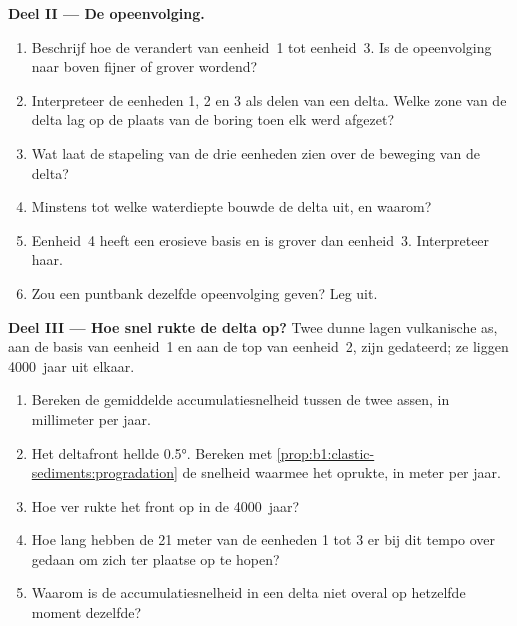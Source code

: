 \begin{problem}
\medskip
\noindent\textbf{Deel II --- De opeenvolging.}
\begin{enumerate}[resume]
  \item Beschrijf hoe de  verandert van eenheid~1 tot
        eenheid~3. Is de opeenvolging naar boven fijner of grover wordend?
  \item Interpreteer de eenheden 1, 2 en 3 als delen van een delta. Welke zone
        van de delta lag op de plaats van de boring toen elk werd afgezet?
  \item Wat laat de stapeling van de drie eenheden zien over de beweging van de
        delta?
  \item Minstens tot welke waterdiepte bouwde de delta uit, en waarom?
  \item Eenheid~4 heeft een erosieve basis en is grover dan eenheid~3. Interpreteer
        haar.
  \item Zou een puntbank dezelfde opeenvolging geven? Leg uit.
\end{enumerate}

\medskip
\noindent\textbf{Deel III --- Hoe snel rukte de delta op?}
Twee dunne lagen vulkanische as, aan de basis van eenheid~1 en aan de top van
eenheid~2, zijn gedateerd; ze liggen \num{4000}~jaar uit elkaar.
\begin{enumerate}[resume]
  \item Bereken de gemiddelde accumulatiesnelheid tussen de twee assen, in
        millimeter per jaar.
  \item Het deltafront hellde \ang{0.5}. Bereken met
        \cref{prop:b1:clastic-sediments:progradation} de snelheid waarmee het
        oprukte, in meter per jaar.
  \item Hoe ver rukte het front op in de \num{4000}~jaar?
  \item Hoe lang hebben de 21 meter van de eenheden 1 tot 3 er bij dit tempo over
        gedaan om zich ter plaatse op te hopen?
  \item Waarom is de accumulatiesnelheid in een delta niet overal op hetzelfde
        moment dezelfde?
\end{enumerate}


\end{problem}
